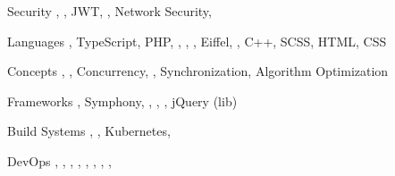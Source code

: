 

\begin{cvskills}

\cvskill
  {Security} %
  {, , JWT, , Network Security, } %

\cvskill
  {Languages} %
  {, TypeScript, PHP, , , , Eiffel, , C++, SCSS, HTML, CSS} %

\cvskill
  {Concepts} %
  {, , Concurrency, , Synchronization, Algorithm Optimization} %

\cvskill
  {Frameworks} %
  {, Symphony, , , , jQuery (lib)} %


\cvskill
  {Build Systems} %
  {, , Kubernetes, } %

\cvskill
  {DevOps} %
  {, , , , , , , , } %


\end{cvskills}

